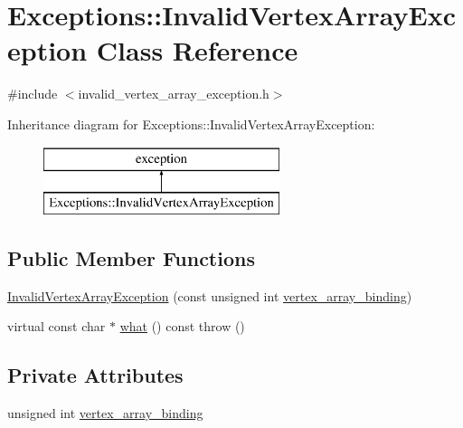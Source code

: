 \hypertarget{class_exceptions_1_1_invalid_vertex_array_exception}{}\section{Exceptions\+:\+:Invalid\+Vertex\+Array\+Exception Class Reference}
\label{class_exceptions_1_1_invalid_vertex_array_exception}


{\ttfamily \#include $<$invalid\+\_\+vertex\+\_\+array\+\_\+exception.\+h$>$}

Inheritance diagram for Exceptions\+:\+:Invalid\+Vertex\+Array\+Exception\+:\begin{figure}[H]
\begin{center}
\leavevmode
\includegraphics[height=2.000000cm]{class_exceptions_1_1_invalid_vertex_array_exception}
\end{center}
\end{figure}
\subsection*{Public Member Functions}
\begin{DoxyCompactItemize}
\item 
\hyperlink{class_exceptions_1_1_invalid_vertex_array_exception_a57cb1b8e280dc527308131a3409db516}{Invalid\+Vertex\+Array\+Exception} (const unsigned int \hyperlink{class_exceptions_1_1_invalid_vertex_array_exception_a600d7d65a0f48fe31c3de57a71766f1b}{vertex\+\_\+array\+\_\+binding})
\item 
virtual const char $\ast$ \hyperlink{class_exceptions_1_1_invalid_vertex_array_exception_a44652236482a680409b0db535c26bfa7}{what} () const   throw ()
\end{DoxyCompactItemize}
\subsection*{Private Attributes}
\begin{DoxyCompactItemize}
\item 
unsigned int \hyperlink{class_exceptions_1_1_invalid_vertex_array_exception_a600d7d65a0f48fe31c3de57a71766f1b}{vertex\+\_\+array\+\_\+binding}
\end{DoxyCompactItemize}



